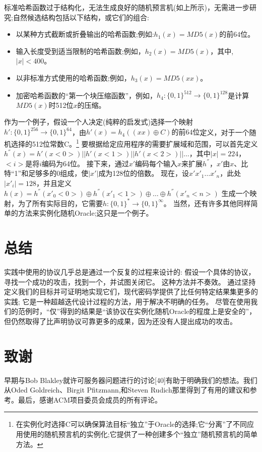 \documentclass[]{article}
\begin{document}
    标准哈希函数过于结构化，无法生成良好的随机预言机(如上所示)，无需进一步研究;自然候选结构包括以下结构，或它们的组合:
    \begin{itemize}
    	\item 以某种方式截断或折叠输出的哈希函数;例如:$h_1(x)=MD5(x)\text{的前64位}$。
    	\item 输入长度受到适当限制的哈希函数;例如，$h_2(x)=MD5(x)$，其中,$|x| < 400$。
    	\item 以非标准方式使用的哈希函数;例如，$h_3(x) = MD5(xx)$。
    	\item 加密哈希函数的“第一个块压缩函数”，例如，$h_4:\{0,1\}^{512}\rightarrow \{0,1\}^{128}$是计算$MD5(x)$时512位$x$的压缩。
    \end{itemize}
    \par
    
    作为一个例子，假设一个人决定(纯粹的启发式)选择一个映射$h':\{0,1\}^{256}\rightarrow \{0,1\}^{64}$，由$h'(x)=h_4((xx)\oplus C) \text{的前64位}$定义，对于一个随机选择的512位常数C。\footnote{在实例化时选择C可以确保算法目标“独立”于Oracle的选择;它“分离”了不同应用使用的随机预言机的实例化;它提供了一种创建多个“独立”随机预言机的简单方法。}
    要根据给定应用程序的需要扩展域和范围，可以首先定义$h^{''}(x)=h'(x<0>)||h'(x<1>)|| h'(x<2>)|| \ldots$，其中$|x| = 224$，$<i>$是将$i$编码为64位。
    接下来，通过$x'$编码每个输入$x$来扩展$h^{''}$，$x'$由$x$、比特“1”和足够多的0组成，使$|x'|$成为128位的倍数。
    现在，设$x'x'_1 \ldots x'_n$，此处$|x'_i|=128$，并且定义$
    h(x)=h^{''}(x'_0<0>)\oplus h^{''}(x'_1<1>)\oplus\ldots \oplus h^{''}(x'_n<n>)$
    生成一个映射，为了所有实际目的，它需要$h:\{0,1\}^*\rightarrow \{0,1\}^\infty$。
    当然，还有许多其他同样简单的方法来实例化随机Oracle;这只是一个例子。
    
    \section{总结}
    
    实践中使用的协议几乎总是通过一个反复的过程来设计的:
    假设一个具体的协议，寻找一个成功的攻击，找到一个，并试图关闭它。
    这种方法并不奏效。
    通过坚持定义我们的目标并可证明地实现它们，现代密码学提供了比任何特定结果集更多的实践;
    它是一种超越迭代设计过程的方法，用于解决不明确的任务。
    尽管在使用我们的范例时，“仅”得到的结果是“该协议在实例化随机Oracle的程度上是安全的”，
    但仍然取得了比声明协议可靠更多的成果，因为还没有人提出成功的攻击。
    
    \section*{致谢}
    早期与Bob Blakley就许可服务器问题进行的讨论[40]有助于明确我们的想法。我们从Oded Goldreich、Birgit Pfitzmann,和Steven Rudich那里得到了有用的建议和参考。最后，感谢ACM项目委员会成员的所有评论。
    
\end{document}
